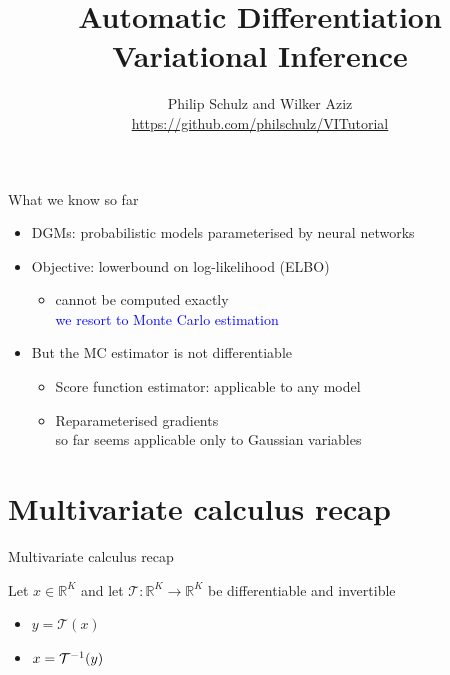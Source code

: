 \documentclass[14pt,dvipsnames]{beamer}
\title{Automatic Differentiation Variational Inference}
\author{Philip Schulz and Wilker Aziz\\
\url{https://github.com/philschulz/VITutorial}}
\date{}
\begin{document}
\begin{frame}
\maketitle
\end{frame}



\begin{frame}{What we know so far}
    \begin{itemize}
        \item DGMs: \pause probabilistic models parameterised by neural networks \pause
        \item Objective: \pause lowerbound on log-likelihood (ELBO) \pause
        \begin{itemize}
        		\item \alert{cannot be computed exactly} \\ \pause
        		\textcolor{blue}{we resort to Monte Carlo estimation} \pause		
	\end{itemize}
	\item \alert{But the MC estimator is not differentiable} \pause		        
	\begin{itemize}
       		\item Score function estimator: applicable to any model  \pause
		\item Reparameterised gradients\\
		so far seems applicable only to Gaussian variables
        \end{itemize}
    \end{itemize}
    
\end{frame}

\frame{\tableofcontents}


\section{Multivariate calculus recap}

\begin{frame}{Multivariate calculus recap}

Let $x \in \mathbb R^K$ and let $\mathcal T: \mathbb R^K \to \mathbb R^K$ be differentiable and invertible
\begin{itemize}
	\item $y = \mathcal T(x)$
	\item $x = {\mathcal T}^{-1}(y)$
\end{itemize}

\end{frame}
\end{document}

